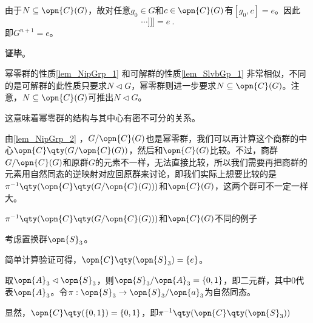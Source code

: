 由于$N\subseteq\opn{C}(G)$，故对任意$g_0\in G$和$c\in\opn{C}(G)$有$[g_0, c]=e$。因此
\begin{equation}
[g_0, [g_1, [g_2\cdots[g_{n-1}, g_n]\cdots]]] =e~. 
\end{equation}
即$G^{n+1}=e$。

\textbf{证毕}。


幂零群的性质\autoref{lem_NipGrp_1} 和可解群的性质\autoref{lem_SlvbGp_1} 非常相似，不同的是可解群的此性质只要求$N\lhd G$，幂零群则进一步要求$N\subseteq \opn{C}(G)$。注意，$N\subseteq \opn{C}(G)$可推出$N\lhd G$。

这意味着幂零群的结构与其中心有密不可分的关系。


由\autoref{lem_NipGrp_2} ，$G/\opn{C}(G)$也是幂零群，我们可以再计算这个商群的中心$\opn{C}\qty(G/\opn{C}(G))$，然后和$\opn{C}(G)$比较。不过，商群$G/\opn{C}(G)$和原群$G$的元素不一样，无法直接比较，所以我们需要再把商群的元素用自然同态的逆映射对应回原群来讨论，即我们实际上想要比较的是$\pi^{-1}\qty(\opn{C}\qty(G/\opn{C}(G)))$和$\opn{C}(G)$，这两个群可不一定一样大。



\begin{example}{$\pi^{-1}\qty(\opn{C}\qty(G/\opn{C}(G)))$和$\opn{C}(G)$不同的例子}

考虑置换群$\opn{S}_3$。

简单计算验证可得，$\opn{C}\qty(\opn{S}_3)=\{e\}$。

取$\opn{A}_3\lhd \opn{S}_3$，则$\opn{S}_3/\opn{A}_3=\{0, 1\}$，即二元群，其中$0$代表$\opn{A}_3$。令$\pi:\opn{S}_3\to \opn{S}_3/\opn{a}_3$为自然同态。

显然，$\opn{C}\qty(\{0, 1\})=\{0, 1\}$，即$\pi^{-1}\qty(\opn{C}\qty(\opn{S}_3))$

\end{example}
























